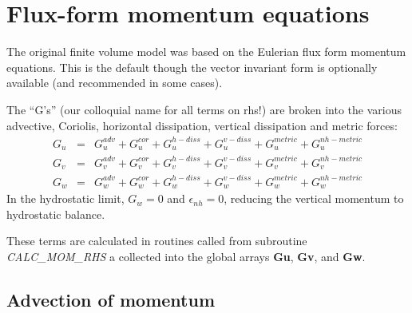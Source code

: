 
\section{Flux-form momentum equations}

The original finite volume model was based on the Eulerian flux form
momentum equations. This is the default though the vector invariant
form is optionally available (and recommended in some cases).

The ``G's'' (our colloquial name for all terms on rhs!) are broken
into the various advective, Coriolis, horizontal dissipation, vertical
dissipation and metric forces:
\begin{eqnarray}
G_u & = & G_u^{adv} + G_u^{cor} + G_u^{h-diss} + G_u^{v-diss} +
G_u^{metric} + G_u^{nh-metric} \label{eq:gsplit_momu} \\
G_v & = & G_v^{adv} + G_v^{cor} + G_v^{h-diss} + G_v^{v-diss} +
G_v^{metric} + G_v^{nh-metric} \label{eq:gsplit_momv} \\
G_w & = & G_w^{adv} + G_w^{cor} + G_w^{h-diss} + G_w^{v-diss} +
G_w^{metric} + G_w^{nh-metric} \label{eq:gsplit_momw}
\end{eqnarray}
In the hydrostatic limit, $G_w=0$ and $\epsilon_{nh}=0$, reducing the
vertical momentum to hydrostatic balance.

These terms are calculated in routines called from subroutine {\em
CALC\_MOM\_RHS} a collected into the global arrays {\bf Gu}, {\bf Gv},
and {\bf Gw}.



\subsection{Advection of momentum}

